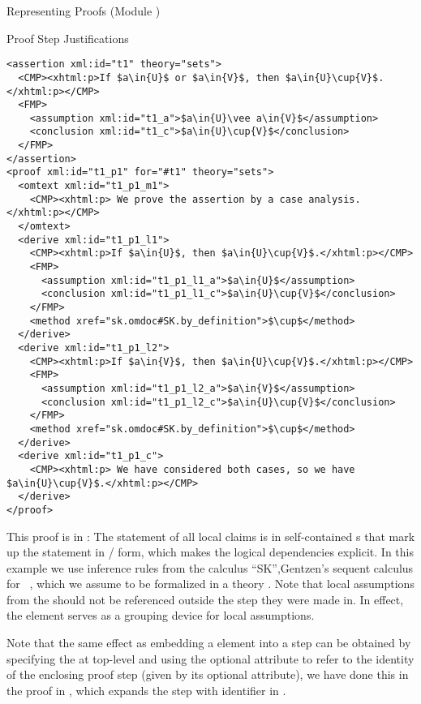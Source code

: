 \begin{tchapter}[id=proofs,short=Representing Proofs]{Representing Proofs (Module {})}
\begin{tsection}[id=proofs:justifications]{Proof Step Justifications}
\begin{lstlisting}[label=lst:expansion,mathescape,
  caption={An {\omdoc} Representation of a Proof by Cases},
  index={proof,derive,method,assumption,conclusion}]
<assertion xml:id="t1" theory="sets">
  <CMP><xhtml:p>If $a\in{U}$ or $a\in{V}$, then $a\in{U}\cup{V}$.</xhtml:p></CMP>
  <FMP>
    <assumption xml:id="t1_a">$a\in{U}\vee a\in{V}$</assumption>
    <conclusion xml:id="t1_c">$a\in{U}\cup{V}$</conclusion>
  </FMP>
</assertion>
<proof xml:id="t1_p1" for="#t1" theory="sets">
  <omtext xml:id="t1_p1_m1">
    <CMP><xhtml:p> We prove the assertion by a case analysis.</xhtml:p></CMP>
  </omtext>
  <derive xml:id="t1_p1_l1">
    <CMP><xhtml:p>If $a\in{U}$, then $a\in{U}\cup{V}$.</xhtml:p></CMP>
    <FMP>
      <assumption xml:id="t1_p1_l1_a">$a\in{U}$</assumption>
      <conclusion xml:id="t1_p1_l1_c">$a\in{U}\cup{V}$</conclusion>
    </FMP>
    <method xref="sk.omdoc#SK.by_definition">$\cup$</method>
  </derive> 
  <derive xml:id="t1_p1_l2">
    <CMP><xhtml:p>If $a\in{V}$, then $a\in{U}\cup{V}$.</xhtml:p></CMP>
    <FMP>
      <assumption xml:id="t1_p1_l2_a">$a\in{V}$</assumption>
      <conclusion xml:id="t1_p1_l2_c">$a\in{U}\cup{V}$</conclusion>
    </FMP>
    <method xref="sk.omdoc#SK.by_definition">$\cup$</method>
  </derive> 
  <derive xml:id="t1_p1_c">
    <CMP><xhtml:p> We have considered both cases, so we have $a\in{U}\cup{V}$.</xhtml:p></CMP>
  </derive> 
</proof>
\end{lstlisting}
This proof is in {{}}: The statement of all
local claims is in self-contained {s} that mark up the statement in
{}/{} form, which makes the logical dependencies
explicit. In this example we use inference rules from the calculus ``SK'',Gentzen's
sequent calculus for {}~\cite{Gentzen:uudlsiii35},
which we assume to be formalized in a theory {}.  Note that local assumptions
from the {} should not be referenced outside the {} step they
were made in. In effect, the {} element serves as a grouping device for
local assumptions.

Note that the same effect as embedding a {} element into a
{} step can be obtained by specifying the {} at top-level
and using the optional {} attribute to refer to the identity of the
enclosing proof step (given by its optional {}
attribute), we have done this in the proof in {}, which expands the
{} step with identifier {} in {}.


\end{tsection}
\end{tchapter}

